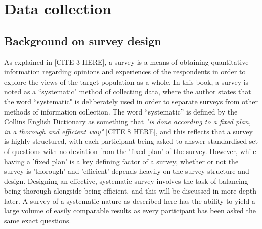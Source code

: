 
\chapter{Data collection}

\section{Background on survey design}




As explained in [CITE 3 HERE], a survey is a means of obtaining quantitative information regarding opinions and 
experiences of the respondents in order to explore the views of the target population as a whole. In this book, a survey 
is noted as a ``systematic" method of collecting data, where the author states that the word ``systematic" is deliberately used 
in order to separate surveys from other methods of information collection. The word ``systematic'' is defined by the Collins English Dictionary as 
something that \textit{"is done according to a fixed plan, in a thorough and efficient way"} [CITE 8 HERE], and this reflects that a survey is 
highly structured, with each participant being asked to answer standardised set of questions with no deviation from the 'fixed plan' of the
survey. However, while having a 'fixed plan' is a key defining factor of a survey, whether or not the survey is 'thorough' and
'efficient' depends heavily on the survey structure and design. Designing an effective, systematic survey involves the task of balancing 
being thorough alongside being efficient, and this will be discussed in more depth later. A survey of a systematic nature as described here has the 
ability to yield a large volume of easily comparable results as every participant has been asked the same exact questions.



